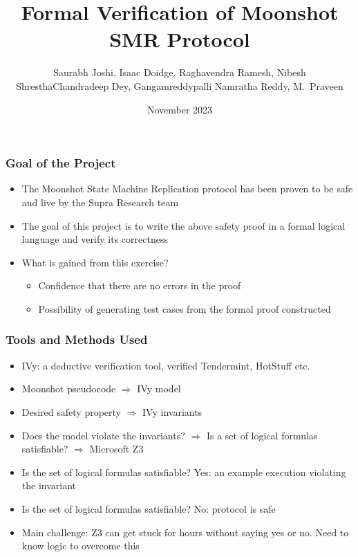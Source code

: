 \documentclass{beamer}
\title{Formal Verification of Moonshot SMR Protocol}
\author{Saurabh Joshi, Isaac Doidge, Raghavendra Ramesh, Nibesh
Shrestha\textbar Chandradeep Dey, Gangamreddypalli Namratha Reddy, M.~Praveen}
\institute{Supra Oracles \textbar~ Chennai Mathematical Institute}
\date{November 2023}
\begin{document}
\begin{frame}
    \titlepage
\end{frame}

\begin{frame}
    \frametitle{Goal of the Project}
    \begin{itemize}
        \item The Moonshot State Machine Replication protocol has been
            proven to be safe and live by the Supra Research team
            \pause
            \vfill
        \item The goal of this project is to write the above safety
            proof in a formal logical language and verify its
            correctness
            \pause
            \vfill
        \item What is gained from this exercise? \pause
            \vfill
            \begin{itemize}
                \item Confidence that there are no errors in the proof
                    \pause
                    \vfill
                \item Possibility of generating test cases from the
                    formal proof constructed
            \end{itemize}
    \end{itemize}
\end{frame}

\begin{frame}
    \frametitle{Tools and Methods Used}
    \begin{itemize}
        \item \alert{IVy}: a deductive
            verification tool, verified Tendermint, HotStuff etc.
            \pause
            \vfill
        \item Moonshot pseudocode $\Rightarrow$ IVy model
            \pause
            \vfill
        \item Desired safety property $\Rightarrow$ IVy invariants
            \pause
            \vfill
        \item Does the model violate the invariants? $\Rightarrow$ Is a set of
            logical formulas satisfiable? \pause $\Rightarrow$ Microsoft Z3
            \pause
            \vfill
        \item Is the set of logical formulas satisfiable? \alert{Yes}:
            an example execution violating the invariant
            \pause
            \vfill
        \item Is the set of logical formulas satisfiable? \alert{No}:
            protocol is safe
            \pause
            \vfill
        \item Main challenge: Z3 can get stuck for hours without
            saying yes or no. \pause Need to know logic to overcome
            this
    \end{itemize}
\end{frame}
\end{document}
